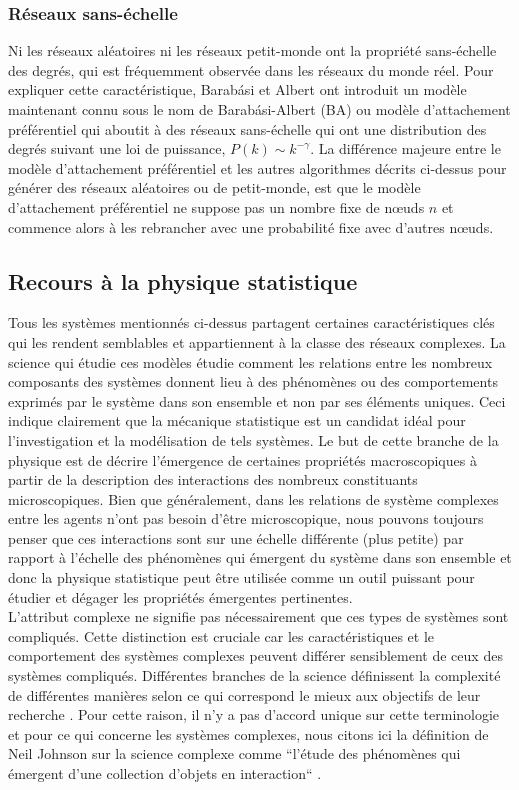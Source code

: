 \subsubsection{Réseaux sans-échelle}
Ni les réseaux aléatoires ni les réseaux petit-monde ont la propriété sans-échelle des degrés, qui est fréquemment
observée dans les réseaux du monde réel. Pour expliquer cette caractéristique, Barab\'{a}si et Albert ont introduit 
un modèle maintenant connu sous le nom de Barab\'{a}si-Albert (BA) \cite{BA1999} ou modèle d'attachement préférentiel
qui aboutit à des réseaux sans-échelle qui ont une distribution des degrés suivant une loi de puissance, 
$P(k)\sim k^{-\gamma}$. La différence majeure entre le modèle d'attachement préférentiel et les autres algorithmes 
décrits ci-dessus pour générer des réseaux aléatoires ou de petit-monde, est que le modèle d'attachement préférentiel
ne suppose pas un nombre fixe de nœuds $n$ et commence alors à les rebrancher avec une probabilité fixe avec d'autres
nœuds.
\subsection{Recours à la physique statistique}
Tous les systèmes mentionnés ci-dessus partagent certaines caractéristiques clés qui les rendent semblables
et appartiennent à la classe des réseaux complexes. La science qui étudie ces modèles étudie comment les 
relations entre les nombreux composants des systèmes donnent lieu à des phénomènes ou des comportements 
exprimés par le système dans son ensemble et non par ses éléments uniques. Ceci indique clairement que
la mécanique statistique est un candidat idéal pour l'investigation et la modélisation de tels systèmes. 
Le but de cette branche de la physique est de décrire l'émergence de certaines propriétés macroscopiques
à partir de la description des interactions des nombreux constituants microscopiques. 
Bien que généralement, dans  les relations de système complexes entre les agents
n'ont pas besoin d'être microscopique, nous pouvons toujours penser que ces interactions sont sur une échelle 
différente (plus petite) par rapport à l'échelle des phénomènes qui émergent du système dans son ensemble et donc 
la physique statistique peut être utilisée comme un outil puissant pour étudier et dégager les propriétés émergentes 
pertinentes.\\
L'attribut complexe ne signifie pas nécessairement que ces types de systèmes sont compliqués. Cette distinction est
cruciale car les caractéristiques et le comportement des systèmes complexes peuvent différer sensiblement de ceux des 
systèmes compliqués. Différentes branches de la science définissent la complexité de différentes manières selon ce
qui correspond le mieux aux objectifs de leur recherche \cite{NR1998,MMW1993,RG1996,MMAM2009}. Pour cette raison, il n'y a pas d'accord unique sur
cette terminologie et pour ce qui concerne les systèmes complexes, nous citons ici la définition de Neil Johnson sur 
la science complexe comme ``l'étude des phénomènes qui émergent d'une collection d'objets en interaction`` \cite{NFJ2007}.